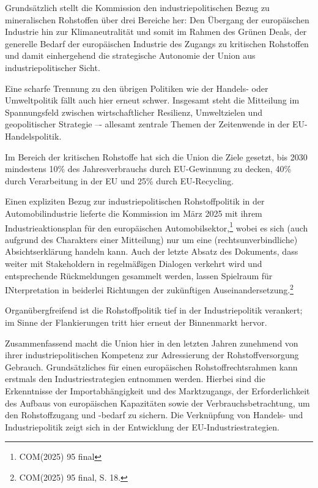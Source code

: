 \documentclass[12pt,a4paper,oneside]{book} %
\begin{document}
Grundsätzlich stellt die Kommission den industriepolitischen Bezug zu mineralischen Rohstoffen über drei Bereiche her: Den Übergang der europäischen Industrie hin zur Klimaneutralität und somit im Rahmen des Grünen Deals, der generelle Bedarf der europäischen Industrie des Zugangs zu kritischen Rohstoffen und damit einhergehend die strategische Autonomie der Union aus industriepolitischer Sicht.

Eine scharfe Trennung zu den übrigen Politiken wie der Handels- oder Umweltpolitik fällt auch hier erneut schwer. Insgesamt steht die Mitteilung im Spannungsfeld zwischen wirtschaftlicher Resilienz, Umweltzielen und geopolitischer Strategie –- allesamt zentrale Themen der Zeitenwende in der EU-Handelspolitik.
	
Im Bereich der kritischen Rohstoffe hat sich die Union die Ziele gesetzt, bis 2030 mindestens 10\% des Jahresverbrauchs durch EU-Gewinnung zu decken, 40\% durch Verarbeitung in der EU und 25\% durch EU-Recycling.

Einen expliziten Bezug zur industriepolitischen Rohstoffpolitik in der Automobilindustrie lieferte die Kommission im März 2025 mit ihrem Industrieaktionsplan für den europäischen Automobilsektor,\footnote{COM(2025) 95 final} wobei es sich (auch aufgrund des Charakters einer Mitteilung) nur um eine (rechtsunverbindliche) Absichtserklärung handeln kann. Auch der letzte Absatz des Dokuments, dass weiter mit Stakeholdern in regelmäßigen Dialogen verkehrt wird und entsprechende Rückmeldungen gesammelt werden, lassen Spielraum für INterpretation in beiderlei Richtungen der zukünftigen Auseinandersetzung.\footnote{COM(2025) 95 final, S. 18.}



Organübergfreifend ist die Rohstoffpolitik tief in der Industriepolitik verankert; im Sinne der Flankierungen tritt hier erneut der Binnenmarkt hervor.

Zusammenfassend macht die Union hier in den letzten Jahren zunehmend von ihrer industriepolitischen Kompetenz zur Adressierung der Rohstoffversorgung Gebrauch. Grundsätzliches für einen europäischen Rohstoffrechtsrahmen kann erstmals den Industriestrategien entnommen werden. Hierbei sind die Erkenntnisse der Importabhängigkeit und des Marktzugangs, der Erforderlichkeit des Aufbaus von europäischen Kapazitäten sowie der Verbrauchsbetrachtung, um den Rohstoffzugang und -bedarf zu sichern. Die Verknüpfung von Handels- und Industriepolitik zeigt sich in der Entwicklung der EU-Industriestrategien.
	
\end{document}
